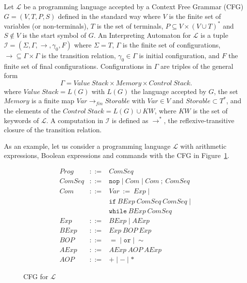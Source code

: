 \documentclass{llncs}%
\begin{document}
Let $\mathcal{L}$ be a programming language accepted by a Context Free Grammar (CFG) $G = (V, T, P, S)$ defined in the standard way where $V$ is the finite set of variables (or non-terminals), $T$ is the set of terminals, $P \subseteq V \times (V \cup T)^*$ and $S \not\in V$ is the start symbol of $G$.
An Interpreting Automaton for $\mathcal{L}$ is a tuple $\mathcal{I} = (\Sigma, \Gamma, \rightarrow, \gamma_0, F)$ where $\Sigma = T$, $\Gamma$ is the finite set of configurations, $\rightarrow \subseteq \Gamma \times \Gamma$ is the transition relation, $\gamma_0 \in \Gamma$ is initial configuration, and $F$ the finite set of final configurations. Configurations in \(\Gamma\) are triples of the general form
\[
\Gamma = \mathit{Value~Stack} \times \mathit{Memory} \times \mathit{Control~Stack}.
\]
where $\mathit{Value~Stack} = L(G)$ with $L(G)$ the language accepted by $G$, the set
\(\mathit{Memory}\) is a finite map \(\mathit{Var}
\to_{\mathit{fin}} \mathit{Storable}\) with $\mathit{Var} \in V$ and $\mathit{Storable} \subset T^*$, and the elements of the
$\mathit{Control~Stack} = L(G) \cup \mathit{KW}$, where $\mathit{KW}$ is the set of keywords of $\mathcal{L}$. 
A computation in $\mathcal{I}$ is defined as $\rightarrow^*$, the reflexive-transitive closure of the transition relation.

As an example, let us consider a programming language $\mathcal{L}$ with arithmetic expressions,
Boolean expressions and commands with the CFG in Figure~\ref{fig:l-cfg}.
\begin{figure}
\[
\begin{array}{rcl}
\mathit{Prog} & ::= &  \mathit{ComSeq} \\
\mathit{ComSeq} & ::= & \mathtt{nop} \mid \mathit{Com} \mid \mathit{Com} ~\mathtt{;}~ \mathit{ComSeq}   \\
\mathit{Com} & ::= & \mathit{Var} ~\mathtt{:=}~ \mathit{Exp} \mid \\
                     &  & \mathtt{if}~ \mathit{BExp}~ \mathit{ComSeq}~ \mathit{ComSeq} \mid \\
                     &  & \mathtt{while}~ \mathit{BExp}~ \mathit{ComSeq} \\
\mathit{Exp} & ::= & \mathit{BExp} \mid \mathit{AExp} \\
\mathit{BExp} & ::= & \mathit{Exp} ~\mathit{BOP}~ \mathit{Exp} \\
\mathit{BOP} & ::= & \mathtt{=} \mid \mathtt{or} \mid \mathtt{∼} \\  
\mathit{AExp} & ::= & \mathit{AExp} ~\mathit{AOP}~ \mathit{AExp} \\
\mathit{AOP} & ::= & \mathtt{+} \mid \mathtt{-} \mid \mathtt{*} 
\end{array}
\]
\caption{CFG for $\mathcal{L}$}\label{fig:l-cfg}
\end{figure}
\end{document}
